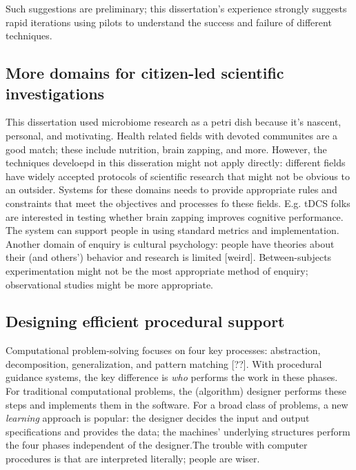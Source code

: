 Such suggestions are preliminary; this dissertation's experience strongly suggests rapid iterations using pilots to understand the success and failure of different techniques. 

\subsection{More domains for citizen-led scientific investigations}
This dissertation used microbiome research as a petri dish because it’s nascent, personal, and motivating. Health related fields with devoted communites are a good match; these include nutrition, brain zapping, and more. However, the techniques develoepd in this disseration might not apply directly: different fields have widely accepted protocols of scientific research that might not be obvious to an outsider. Systems for these domains needs to provide appropriate rules and constraints that meet the objectives and processes fo these fields. E.g. tDCS folks are interested in testing whether brain zapping improves cognitive performance. The system can support people in using standard metrics and implementation. Another domain of enquiry is cultural psychology: people have theories about their (and others') behavior and research is limited [weird]. Between-subjects experimentation might not be the most appropriate method of enquiry; observational studies might be more appropriate.

\subsection{Designing efficient procedural support}

Computational problem-solving focuses on four key processes: abstraction, decomposition, generalization, and pattern matching [??]. With procedural guidance systems, the key difference is \textit{who} performs the work in these phases. For traditional computational problems, the (algorithm) designer performs these steps and implements them in the software. For a broad class of problems, a new \textit{learning} approach is popular: the designer decides the input and output specifications and provides the data; the machines' underlying structures perform the four phases independent of the designer.The trouble with computer procedures is that are interpreted literally; people are wiser. 

